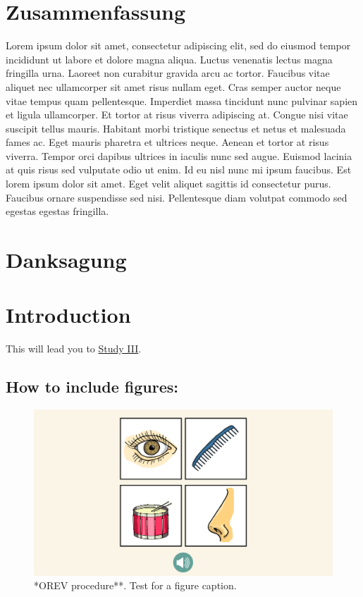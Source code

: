 \documentclass[
]{scrbook}
\begin{document}
\chapter{Zusammenfassung}\label{zusammenfassung}

Lorem ipsum dolor sit amet, consectetur adipiscing elit, sed do eiusmod tempor incididunt ut labore et dolore magna aliqua. Luctus venenatis lectus magna fringilla urna. Laoreet non curabitur gravida arcu ac tortor. Faucibus vitae aliquet nec ullamcorper sit amet risus nullam eget. Cras semper auctor neque vitae tempus quam pellentesque. Imperdiet massa tincidunt nunc pulvinar sapien et ligula ullamcorper. Et tortor at risus viverra adipiscing at. Congue nisi vitae suscipit tellus mauris. Habitant morbi tristique senectus et netus et malesuada fames ac. Eget mauris pharetra et ultrices neque. Aenean et tortor at risus viverra. Tempor orci dapibus ultrices in iaculis nunc sed augue. Euismod lacinia at quis risus sed vulputate odio ut enim. Id eu nisl nunc mi ipsum faucibus. Est lorem ipsum dolor sit amet. Eget velit aliquet sagittis id consectetur purus. Faucibus ornare suspendisse sed nisi. Pellentesque diam volutpat commodo sed egestas egestas fringilla.

\chapter{Danksagung}\label{danksagung}

\mainmatter

\chapter{Introduction}\label{introduction}

This will lead you to \hyperref[studyIII]{Study III}.

\section{How to include figures:}\label{how-to-include-figures}



\begin{figure}

{\centering \includegraphics[width=1\linewidth]{../figures/orev} 

}

\caption{*OREV procedure**. Test for a figure caption.}\label{fig:fig1}
\end{figure}
\end{document}
